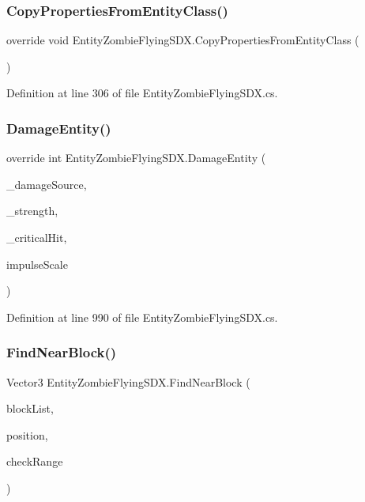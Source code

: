 \subsubsection{\texorpdfstring{CopyPropertiesFromEntityClass()}{CopyPropertiesFromEntityClass()}}
{\footnotesize\ttfamily override void Entity\+Zombie\+Flying\+S\+D\+X.\+Copy\+Properties\+From\+Entity\+Class (\begin{DoxyParamCaption}{ }\end{DoxyParamCaption})}



Definition at line 306 of file Entity\+Zombie\+Flying\+S\+D\+X.\+cs.

\mbox{\label{class_entity_zombie_flying_s_d_x_a40a1f0533c03645cee4416310bd32c2a}} 
\subsubsection{\texorpdfstring{DamageEntity()}{DamageEntity()}}
{\footnotesize\ttfamily override int Entity\+Zombie\+Flying\+S\+D\+X.\+Damage\+Entity (\begin{DoxyParamCaption}\item[{Damage\+Source}]{\+\_\+damage\+Source,  }\item[{int}]{\+\_\+strength,  }\item[{bool}]{\+\_\+critical\+Hit,  }\item[{float}]{impulse\+Scale }\end{DoxyParamCaption})}



Definition at line 990 of file Entity\+Zombie\+Flying\+S\+D\+X.\+cs.

\mbox{\label{class_entity_zombie_flying_s_d_x_abc60393e4edf3774fd578ea9ffd44fbe}} 
\subsubsection{\texorpdfstring{FindNearBlock()}{FindNearBlock()}}
{\footnotesize\ttfamily Vector3 Entity\+Zombie\+Flying\+S\+D\+X.\+Find\+Near\+Block (\begin{DoxyParamCaption}\item[{Hash\+Set$<$ string $>$}]{block\+List,  }\item[{Vector3}]{position,  }\item[{int}]{check\+Range }\end{DoxyParamCaption})}



